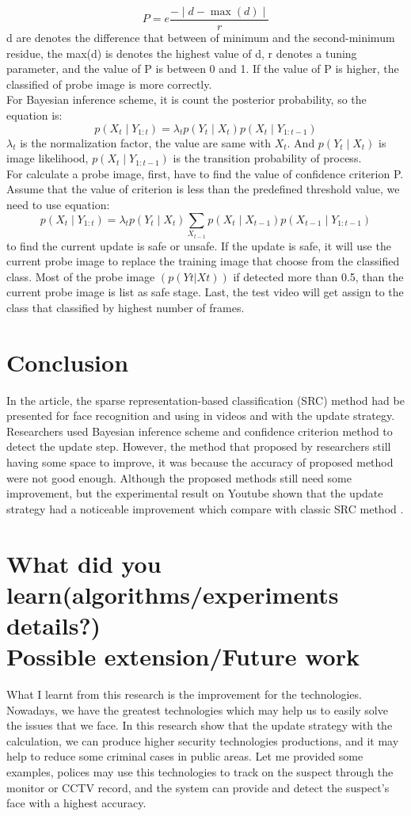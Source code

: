 \documentclass[12pt]{article}
\begin{document}
\[P=e\frac{-\mid d - \max (d) \mid}{r}\]
d are denotes the difference that between of minimum and the second-minimum residue, the max(d) is denotes the highest value of d, r denotes a tuning parameter, and the value of P is between 0 and 1. If the value of P is higher, the classified of probe image is more correctly. \vspace{3mm}\\
For Bayesian inference scheme, it is count the posterior probability, so the equation is:
\[p(X_t \mid Y_{1:t})=\lambda_tp(Y_t\mid X_t)p(X_t \mid Y_{1:t-1})\]
$\lambda_t$ is the normalization factor, the value are same with $X_t$. And $p(Y_t\mid X_t)$ is image likelihood, $p(X_t \mid Y_{1:t-1})$ is the transition probability of process.\vspace{3mm}\\
  For calculate a probe image, first, have to find the value of confidence criterion P. Assume that the value of criterion is less than the predefined threshold value, we need to use equation:
\[p(X_t \mid Y_{1:t})=\lambda_tp(Y_t \mid X_t)\sum_{X_{t-1}}p(X_t \mid X_{t-1})p(X_{t-1} \mid Y_{1:t-1})\]
to find the current update is safe or unsafe. If the update is safe, it will use the current probe image to replace the training image that choose from the classified class. Most of the probe image $(p(Yt|Xt) )$ if detected more than 0.5, than the current probe image is list as safe stage. Last, the test video will get assign to the class that classified by highest number of frames.
\section{Conclusion}
\hspace{1cm}In the article, the sparse representation-based classification (SRC) method had be presented for face recognition and using in videos and with the update strategy. Researchers used Bayesian inference scheme and confidence criterion method to detect the update step. However, the method that proposed by researchers still having some space to improve, it was because the accuracy of proposed method were not good enough. Although the proposed methods still need some improvement, but the experimental result on Youtube shown that the update strategy had a noticeable improvement which compare with classic SRC method .


\section{What did you learn(algorithms/experiments details?)\\
Possible extension/Future work
}
\hspace{1cm}What I learnt from this research is the improvement for the technologies. Nowadays, we have the greatest technologies which may help us to easily solve the issues that we face. In this research show that the update strategy with the calculation, we can produce higher security technologies productions, and it may help to reduce some criminal cases in public areas. Let me provided some examples, polices may use this technologies to track on the suspect through the monitor or CCTV record, and the system can provide and detect the suspect’s face with a highest accuracy.
\end{document}
